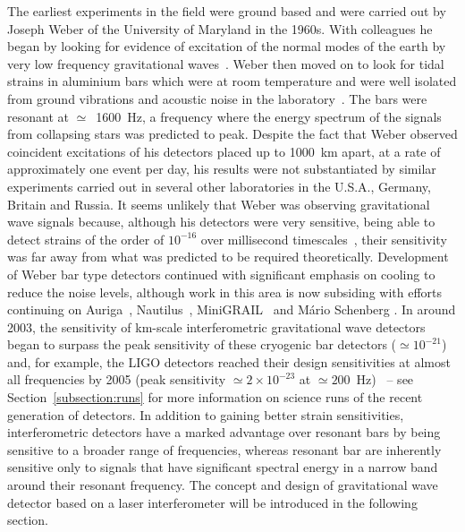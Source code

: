\documentclass{article}
\begin{document}
The earliest experiments in the field were ground based and were carried out by
Joseph Weber of the University of Maryland in the 1960s. With colleagues he
began by looking for evidence of excitation of the normal modes of the earth by
very low frequency gravitational waves~\cite{Forward2}. Weber then moved on to
look for tidal strains in aluminium bars which were at room temperature and were
well isolated from ground vibrations and acoustic noise in the
laboratory~\cite{Weber1, Weber2}. The bars were resonant at $\simeq$~1600~Hz, a
frequency where the energy spectrum of the signals from collapsing stars was
predicted to peak. Despite the fact that Weber observed coincident excitations
of his detectors placed up to 1000~km apart, at a rate of approximately one
event per day, his results were not substantiated by similar experiments carried
out in several other laboratories in the U.S.A., Germany, Britain and Russia. It
seems unlikely that Weber was observing gravitational wave signals because,
although his detectors were very sensitive, being able to detect strains of the
order of $10^{-16}$ over millisecond timescales~\cite{Weber1}, their sensitivity
was far away from what was predicted to be required theoretically. Development
of Weber bar type detectors continued with significant emphasis on cooling to
reduce the noise levels, although work in this area is now subsiding with
efforts continuing on Auriga~\cite{AURIGA}, Nautilus~\cite{NAUTILUS},
MiniGRAIL~\cite{MiniGRAIL, Gottardi:2007} and M\'{a}rio Schenberg
\cite{Schenberg, Aguiar:2006}.  In around 2003, the sensitivity of km-scale
interferometric gravitational wave detectors began to surpass the peak
sensitivity of these cryogenic bar detectors ($\simeq 10^{-21}$)
and, for example, the LIGO detectors reached their design sensitivities at
almost all frequencies by 2005 (peak sensitivity $\simeq 2\times10^{-23}$ at
$\simeq200$~Hz)~\cite{Whitcomb:2008} -- see Section~\ref{subsection:runs} for more
information on science runs of the recent generation of detectors.  In addition
to gaining better strain sensitivities, interferometric detectors have a marked
advantage over resonant bars by being sensitive to a broader range of
frequencies, whereas resonant bar are inherently sensitive only to signals that
have significant spectral energy in a narrow band around their resonant
frequency. The concept and design of gravitational wave detector based on a
laser interferometer will be introduced in the following section.


\end{document}
